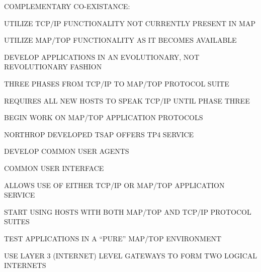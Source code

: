 \begin{bwslide}

\begin{nrtc}
\item	COMPLEMENTARY CO-EXISTANCE:
    \begin{nrtc}
    \item	UTILIZE TCP/IP FUNCTIONALITY NOT CURRENTLY PRESENT IN MAP
    \item	UTILIZE MAP/TOP FUNCTIONALITY AS IT BECOMES AVAILABLE
    \end{nrtc}
\item	DEVELOP APPLICATIONS IN AN EVOLUTIONARY,
	NOT REVOLUTIONARY FASHION
\end{nrtc}
\end{bwslide}


\begin{bwslide}

\begin{nrtc}
\item	THREE PHASES FROM TCP/IP TO MAP/TOP
	PROTOCOL SUITE
\item	REQUIRES ALL NEW HOSTS TO SPEAK TCP/IP UNTIL PHASE THREE
\end{nrtc}
\end{bwslide}


\begin{bwslide}

\begin{nrtc}
\item	BEGIN WORK ON MAP/TOP APPLICATION PROTOCOLS
\item	NORTHROP DEVELOPED TSAP OFFERS TP4 SERVICE
\item	DEVELOP COMMON USER AGENTS
    \begin{nrtc}
    \item	COMMON USER INTERFACE
    \item	ALLOWS USE OF EITHER TCP/IP OR MAP/TOP APPLICATION SERVICE
    \end{nrtc}
\end{nrtc}
\end{bwslide}


\begin{bwslide}

\begin{nrtc}
\item	START USING HOSTS WITH BOTH MAP/TOP AND TCP/IP PROTOCOL SUITES
\item	TEST APPLICATIONS IN A ``PURE'' MAP/TOP ENVIRONMENT
\item	USE LAYER 3 (INTERNET) LEVEL GATEWAYS TO FORM TWO LOGICAL INTERNETS
\end{nrtc}
\end{bwslide}


